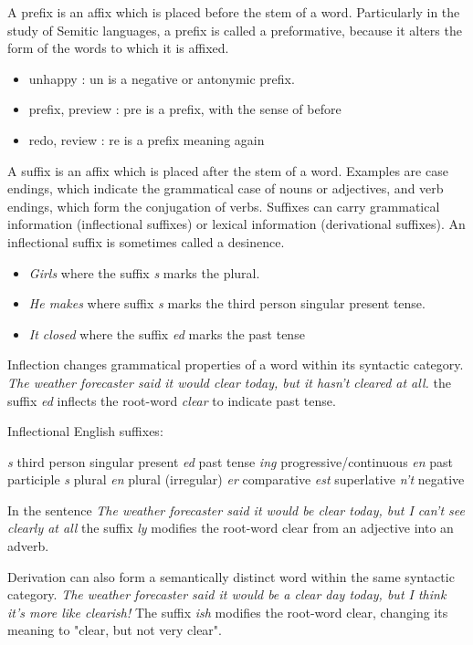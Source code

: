 A prefix is an affix which is placed before the stem of a word. Particularly in the study of Semitic languages, a prefix is called a preformative, because it alters the form of the words to which it is affixed.
\begin{itemize}
  \item unhappy : un is a negative or antonymic prefix.
  \item prefix, preview : pre is a prefix, with the sense of before
  \item redo, review : re is a prefix meaning again
\end{itemize}

A suffix is an affix which is placed after the stem of a word. Examples are case endings, which indicate the grammatical case of nouns or adjectives, and verb endings, which form the conjugation of verbs.
Suffixes can carry grammatical information (inflectional suffixes) or lexical information (derivational suffixes). An inflectional suffix is sometimes called a desinence.
\begin{itemize}
  \item \emph{Girls} where the suffix \emph{s} marks the plural.
  \item \emph{He makes} where suffix \emph{s} marks the third person singular present tense.
  \item \emph{It closed} where the suffix \emph{ed} marks the past tense
\end{itemize}
Inflection changes grammatical properties of a word within its syntactic category.
\emph{The weather forecaster said it would clear today, but it hasn't cleared at all.}
the suffix \emph{ed} inflects the root-word \emph{clear} to indicate past tense.

Inflectional English suffixes:

\emph{s} third person singular present
\emph{ed} past tense
\emph{ing} progressive/continuous
\emph{en} past participle
\emph{s} plural
\emph{en} plural (irregular)
\emph{er} comparative
\emph{est} superlative
\emph{n't} negative

In the sentence \emph{The weather forecaster said it would be clear today, but I can't see clearly at all}
the suffix \emph{ly} modifies the root-word clear from an adjective into an adverb.

Derivation can also form a semantically distinct word within the same syntactic category.  \emph{The weather forecaster said it would be a clear day today, but I think it's more like clearish!}
The suffix \emph{ish} modifies the root-word clear, changing its meaning to "clear, but not very clear".

